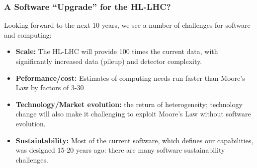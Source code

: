 \begin{frame}
\frametitle{A Software ``Upgrade'' for the HL-LHC?}

Looking forward to the next 10 years, we see a number of challenges for software and computing:

\begin{itemize}
\item {\bf Scale:} The HL-LHC will provide 100 times the current data, with significantly increased data (pileup) and detector complexity.
\item {\bf Peformance/cost:} Estimates of computing needs run faster than Moore's Law by factors of 3-30
\item {\bf Technology/Market evolution:} the return of heterogeneity; technology change will also make it challenging to exploit Moore's Law without software evolution.
\item {\bf Sustaintability:} Most of the current software, which defines our capabilities, was designed 15-20 years ago: there are many software sustainability challenges.
\end{itemize}

\end{frame}


